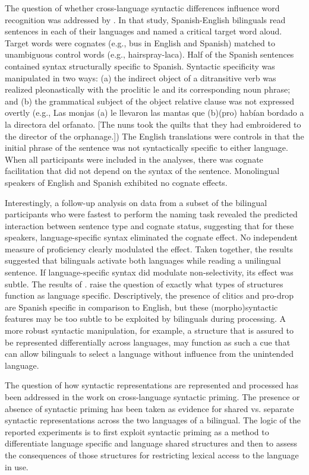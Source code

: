 The question of whether cross-language syntactic differences influence word recognition was addressed by  \citet{Gullifer2011}. In that study, Spanish-English bilinguals read sentences in each of their languages and named a critical target word aloud. Target words were cognates (e.g., bus in English and Spanish) matched to unambiguous control words (e.g., hairspray-laca). Half of the Spanish sentences contained syntax structurally specific to Spanish. Syntactic specificity was manipulated in two ways: (a) the indirect object of a ditransitive verb was realized pleonastically with the proclitic le and its corresponding noun phrase; and (b) the grammatical subject of the object relative clause was not expressed overtly (e.g., Las monjas (a) le llevaron las mantas que (b)(pro) hab\'{i}an bordado a la directora del orfanato. [The nuns took the quilts that they had embroidered to the director of the orphanage.]) The English translations were controls in that the initial phrase of the sentence was not syntactically specific to either language. When all participants were included in the analyses, there was cognate facilitation that did not depend on the syntax of the sentence. Monolingual speakers of English and Spanish exhibited no cognate effects. 

Interestingly, a follow-up analysis on data from a subset of the bilingual participants who were fastest to perform the naming task revealed the predicted interaction between sentence type and cognate status, suggesting that for these speakers, language-specific syntax eliminated the cognate effect. No independent measure of proficiency clearly modulated the effect. Taken together, the results suggested that bilinguals activate both languages while reading a unilingual sentence. If language-specific syntax did modulate non-selectivity, its effect was subtle. The results of  \citet{Gullifer2011}. raise the question of exactly what types of structures function as language specific. Descriptively, the presence of clitics and pro-drop are Spanish specific in comparison to English, but these (morpho)syntactic features may be too subtle to be exploited by bilinguals during processing. A more robust syntactic manipulation, for example, a structure that is assured to be represented differentially across languages, may function as such a cue that can allow bilinguals to select a language without influence from the unintended language. 

The question of how syntactic representations are represented and processed has been addressed in the work on cross-language syntactic priming. The presence or absence of syntactic priming has been taken as evidence for shared vs. separate syntactic representations across the two languages of a bilingual. The logic of the reported  experiments is to first exploit syntactic priming as a method to differentiate language specific and language shared structures and then to assess the consequences of those structures for restricting lexical access to the language in use.

